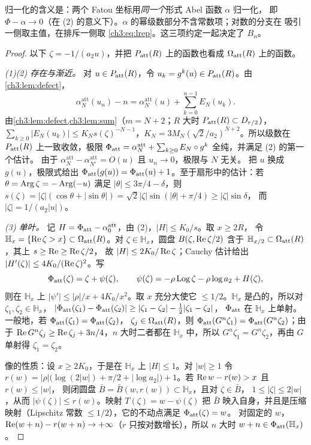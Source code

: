 归一化的含义是：两个 Fatou 坐标用\emph{同一个}形式 Abel 函数 $\alpha$ 归一化，
即 $\Phi-\alpha\to0$（在 (2) 的意义下）。$\alpha$ 的幂级数部分不含常数项；对数的分支在
吸引一侧取主值，在排斥一侧取 \eqref{ch3:eq:lrep}。这三项约定一起决定了 $B_n$。

\begin{proof}
以下 $\zeta=-1/(a_2u)$，并把 $P_{\mathrm{att}}(R)$ 上的函数也看成 $\Omega_{\mathrm{att}}(R)$ 上的函数。

\emph{(1)(2) 存在与渐近。} 对 $u\in P_{\mathrm{att}}(R)$，令 $u_k=g^k(u)\in P_{\mathrm{att}}(R)$。由\cref{ch3:lem:defect}，
\[
 \alpha_N^{\mathrm{att}}(u_n)-n=\alpha_N^{\mathrm{att}}(u)+\sum_{k=0}^{n-1}E_N(u_k).
\]
由\cref{ch3:lem:defect,ch3:lem:sum}（$m=N+2$；$R$ 大时 $P_{\mathrm{att}}(R)\subset D_{r/2}$），
$\sum_{k\ge0}|E_N(u_k)|\le K_Ns(\zeta)^{-N-1}$，$K_N=3M_N(\sqrt2/a_2)^{N+2}$。所以级数在
$P_{\mathrm{att}}(R)$ 上一致收敛，极限
$\Phi_{\mathrm{att}}=\alpha_N^{\mathrm{att}}+\sum_{k\ge0}E_N\circ g^k$ 全纯，并满足 (2) 的第一个估计。
由于 $\alpha_N^{\mathrm{att}}-\alpha_{N'}^{\mathrm{att}}=O(u)$ 且 $u_n\to0$，极限与 $N$ 无关。
把 $u$ 换成 $g(u)$，极限式给出 $\Phi_{\mathrm{att}}(g(u))=\Phi_{\mathrm{att}}(u)+1$。至于扇形中的估计：若
$\theta=\operatorname{Arg}\zeta=-\operatorname{Arg}(-u)$ 满足 $|\theta|\le3\pi/4-\delta$，则
$s(\zeta)=|\zeta|(\cos\theta+|\sin\theta|)=\sqrt2|\zeta|\sin(|\theta|+\pi/4)\ge|\zeta|\sin\delta$，
而 $|\zeta|=1/(a_2|u|)$。

\emph{(3) 单叶。} 记 $H=\Phi_{\mathrm{att}}-\alpha_0^{\mathrm{att}}$，由 (2)，$|H|\le K_0/s$。取 $x\ge2R$，
令 $\mathbb H_x=\{\operatorname{Re}\zeta>x\}\subset\Omega_{\mathrm{att}}(R)$。对 $\zeta\in\mathbb H_x$，圆盘
$B(\zeta,\operatorname{Re}\zeta/2)$ 含于 $\mathbb H_{x/2}\subset\Omega_{\mathrm{att}}(R)$，其上 $s\ge\operatorname{Re}\ge\operatorname{Re}\zeta/2$，
故 $|H|\le2K_0/\operatorname{Re}\zeta$；Cauchy 估计给出 $|H'(\zeta)|\le4K_0/(\operatorname{Re}\zeta)^2$。写
\[
 \Phi_{\mathrm{att}}(\zeta)=\zeta+\psi(\zeta),\qquad \psi(\zeta)=-\rho\operatorname{Log}\zeta-\rho\log a_2+H(\zeta),
\]
则在 $\mathbb H_x$ 上 $|\psi'|\le|\rho|/x+4K_0/x^2$。取 $x$ 充分大使它 $\le1/2$。$\mathbb H_x$
是凸的，所以对 $\zeta_1,\zeta_2\in\mathbb H_x$，
$|\Phi_{\mathrm{att}}(\zeta_1)-\Phi_{\mathrm{att}}(\zeta_2)|\ge|\zeta_1-\zeta_2|-\tfrac12|\zeta_1-\zeta_2|$，
$\Phi_{\mathrm{att}}$ 在 $\mathbb H_x$ 上单射。一般地，若 $\Phi_{\mathrm{att}}(\zeta_1)=\Phi_{\mathrm{att}}(\zeta_2)$，
$\zeta_j\in\Omega_{\mathrm{att}}(R)$，则 $\Phi_{\mathrm{att}}(G^n\zeta_1)=\Phi_{\mathrm{att}}(G^n\zeta_2)$；由于
$\operatorname{Re} G^n\zeta_j\ge\operatorname{Re}\zeta_j+3n/4$，$n$ 大时二者都在 $\mathbb H_x$ 中，所以
$G^n\zeta_1=G^n\zeta_2$，再由 $G$ 单射得 $\zeta_1=\zeta_2$。

像的性质：设 $x\ge2K_0$，于是在 $\mathbb H_x$ 上 $|H|\le1$。对 $|w|\ge1$ 令
$r(w)=|\rho|\bigl(\log(2|w|)+\pi/2+|\log a_2|\bigr)+1$。若 $\operatorname{Re} w-r(w)>x$ 且 $r(w)\le|w|$，
则闭圆盘 $\bar B=\bar B(w,r(w))\subset\mathbb H_x$，且对 $\zeta\in\bar B$，
$1\le|\zeta|\le2|w|$，从而 $|\psi(\zeta)|\le r(w)$。映射 $T(\zeta)=w-\psi(\zeta)$ 把 $\bar B$
映入自身，并且是压缩映射（Lipschitz 常数 $\le1/2$），它的不动点满足 $\Phi_{\mathrm{att}}(\zeta)=w$。
对固定的 $w$，$\operatorname{Re}(w+n)-r(w+n)\to+\infty$（$r$ 只按对数增长），所以 $n$ 大时
$w+n\in\Phi_{\mathrm{att}}(\mathbb H_x)$。


\end{proof}
